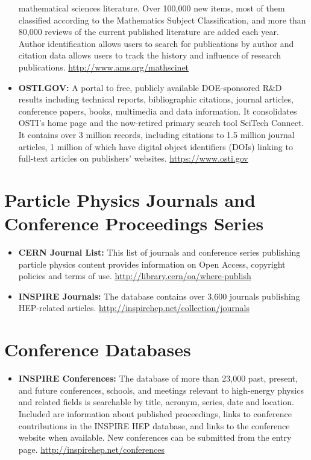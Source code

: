 \begin{itemize}
  mathematical sciences literature. Over 100,000 new items, most of them
  classified according to the Mathematics Subject Classification, and
  more than 80,000 reviews of the current published literature are added
  each year. Author identification allows users to search for
  publications by author and citation data allows users to track the
  history and influence of research publications.
  \url{http://www.ams.org/mathscinet}
\item
  \textbf{OSTI.GOV:} A portal to free, publicly available DOE-sponsored
  R\&D results including technical reports, bibliographic citations,
  journal articles, conference papers, books, multimedia and data
  information. It consolidates OSTI's home page and the now-retired
  primary search tool SciTech Connect. It contains over 3 million
  records, including citations to 1.5 million journal articles, 1
  million of which have digital object identifiers (DOIs) linking to
  full-text articles on publishers' websites. \url{https://www.osti.gov}
\end{itemize}

\section{Particle Physics Journals and Conference Proceedings
Series}\label{databases:sec:journals}

\begin{itemize}
\item
  \textbf{CERN Journal List:} This list of journals and conference
  series publishing particle physics content provides information on
  Open Access, copyright policies and terms of use.
  \url{http://library.cern/oa/where-publish}
\item
  \textbf{INSPIRE Journals:} The database contains over 3,600 journals
  publishing HEP-related articles.
  \url{http://inspirehep.net/collection/journals}
\end{itemize}

\section{Conference Databases}\label{databases:sec:conference}

\begin{itemize}
\tightlist
\item
  \textbf{INSPIRE Conferences:} The database of more than 23,000 past,
  present, and future conferences, schools, and meetings relevant to
  high-energy physics and related fields is searchable by title,
  acronym, series, date and location. Included are information about
  published proceedings, links to conference contributions in the
  INSPIRE HEP database, and links to the conference website when
  available. New conferences can be submitted from the entry page.
  \url{http://inspirehep.net/conferences}
\end{itemize}

